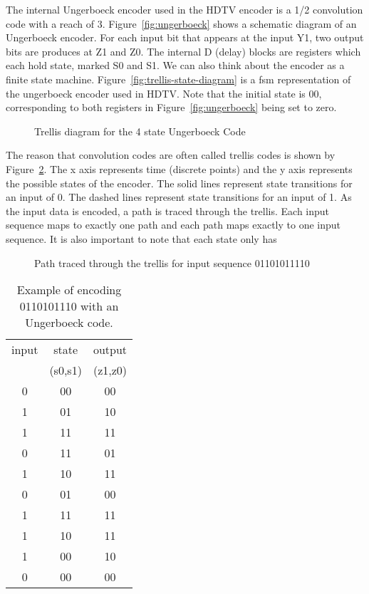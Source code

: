 \documentclass{article}
\begin{document}
The internal Ungerboeck encoder used in the HDTV encoder is
a 1/2 convolution code with a reach of 3. Figure~\ref{fig:ungerboeck}
shows a schematic diagram of an Ungerboeck encoder. For each input bit
that appears at the input Y1, two output bits are produces at Z1 and Z0.
The internal D (delay) blocks are registers which each hold state, marked
S0 and S1. We can also think about the encoder as a finite state machine.
Figure~\ref{fig:trellis-state-diagram} is a fsm representation of the ungerboeck
encoder used in HDTV. Note that the initial state is 00, corresponding to 
both registers in Figure~\ref{fig:ungerboeck} being set to zero.

\begin{figure}
\center
\epsfxsize=5.5in
\caption{Trellis diagram for the 4 state Ungerboeck Code}
\label{fig:trellis-blank}
\end{figure}

The reason that convolution codes are often called trellis codes is shown by 
Figure~\ref{fig:trellis-example}. The x axis represents time (discrete points)
and the y axis represents the possible states of the encoder. The solid lines
represent state transitions for an input of 0. The dashed lines represent
state transitions for an input of 1. As the input
data is encoded, a path is traced through the trellis. Each input sequence maps 
to exactly one path and each path maps exactly to one input sequence. It
is also important to note that each state only has 

\begin{figure}
\center
\epsfxsize=5.5in
\caption{Path traced through the trellis for input sequence 01101011110}
\label{fig:trellis-example}
\end{figure}

\begin{table}
\center
\begin{tabular}{c|c|c}
input & state   & output  \\
      & (s0,s1) & (z1,z0) \\
\hline
0 & 00 & 00 \\
1 & 01 & 10 \\
1 & 11 & 11 \\
0 & 11 & 01 \\
1 & 10 & 11 \\
0 & 01 & 00 \\
1 & 11 & 11 \\
1 & 10 & 11 \\
1 & 00 & 10 \\
0 & 00 & 00 \\
\end{tabular}
\caption{Example of encoding 0110101110 with an Ungerboeck code.}
\label{tbl:ungerboeck_example}
\end{table}
\end{document}

